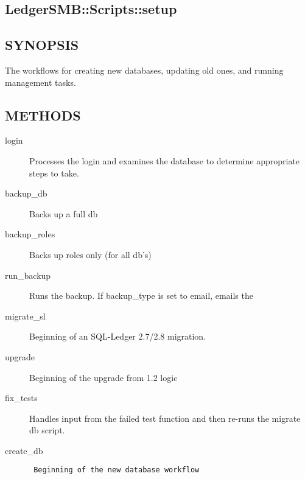 \begin{description}
\section{LedgerSMB::Scripts::setup\label{LedgerSMB::Scripts::setup}}




\subsection*{SYNOPSIS\label{LedgerSMB::Scripts::setup_SYNOPSIS}}


The workflows for creating new databases, updating old ones, and running
management tasks.

\subsection*{METHODS\label{LedgerSMB::Scripts::setup_METHODS}}
\begin{description}

\item[{login}] \mbox{}

Processes the login and examines the database to determine appropriate steps to
take.


\item[{backup\_db}] \mbox{}

Backs up a full db


\item[{backup\_roles}] \mbox{}

Backs up roles only (for all db's)


\item[{run\_backup}] \mbox{}

Runs the backup.  If backup\_type is set to email, emails the


\item[{migrate\_sl}] \mbox{}

Beginning of an SQL-Ledger 2.7/2.8 migration.


\item[{upgrade}] \mbox{}

Beginning of the upgrade from 1.2 logic


\item[{fix\_tests}] \mbox{}

Handles input from the failed test function and then re-runs the migrate db 
script.


\item[{create\_db}] \mbox{}\begin{verbatim}
 Beginning of the new database workflow
\end{verbatim}


\end{description}
\end{description}
